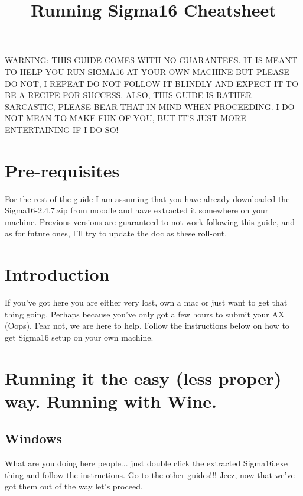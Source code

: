\documentclass[11pt,a4paper]{article}
\title{Running Sigma16 Cheatsheet}
\begin{document}
\maketitle


WARNING: THIS GUIDE COMES WITH NO GUARANTEES. IT IS MEANT TO HELP YOU RUN SIGMA16 AT YOUR OWN MACHINE BUT PLEASE DO NOT, I REPEAT DO NOT FOLLOW IT BLINDLY AND EXPECT IT TO BE A RECIPE FOR SUCCESS. ALSO, THIS GUIDE IS RATHER SARCASTIC, PLEASE BEAR THAT IN MIND WHEN PROCEEDING. I DO NOT MEAN TO MAKE FUN OF YOU, BUT IT'S JUST MORE ENTERTAINING IF I DO SO!

\setcounter{section}{-1}
\section{Pre-requisites}
 For the rest of the guide I am assuming that you have already downloaded the Sigma16-2.4.7.zip from moodle and have extracted it somewhere on your machine. Previous versions are guaranteed to not work following this guide, and as for future ones, I'll try to update the doc as these roll-out.

\section{Introduction}

 If you've got here you are either very lost, own a mac or just want to get that thing going. Perhaps because you've only got a few hours to submit your AX (Oops). Fear not, we are here to help. Follow the instructions below on how to get Sigma16 setup on your own machine.

\section{Running it the easy (less proper) way. Running with Wine.}

\setcounter{subsection}{-1}
 \subsection{Windows}
   What are you doing here people... just double click the extracted Sigma16.exe thing and follow the instructions. Go to the other guides!!! Jeez, now that we've got them out of the way let's proceed.
\end{document}
